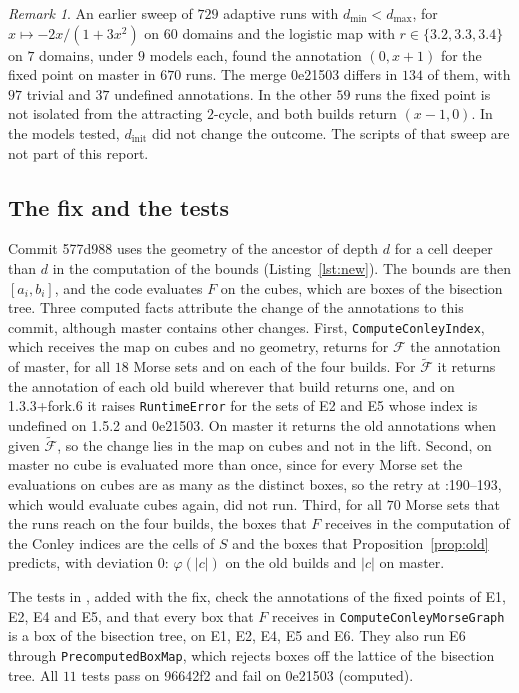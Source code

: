 \documentclass[11pt]{article}
\theoremstyle{plain}
\theoremstyle{definition}
\theoremstyle{remark}
\newtheorem{remark}[proposition]{Remark}
\newcommand{\Fc}{\mathcal{F}}
\newcommand{\Ft}{\tilde{\mathcal{F}}}
\newcommand{\dmin}{d_{\min}}
\newcommand{\dmax}{d_{\max}}
\newcommand{\dinit}{d_{\mathrm{init}}}
\newcommand{\code}[1]{\texttt{#1}}
\begin{document}
\begin{remark}\label{rem:sweep}
An earlier sweep of $729$ adaptive runs with $\dmin<\dmax$, for $x\mapsto-2x/(1+3x^2)$ on $60$ domains and the logistic map with $r\in\{3.2,3.3,3.4\}$ on $7$ domains, under $9$ models each, found the annotation $(0,x+1)$ for the fixed point on master in $670$ runs. The merge 0e21503 differs in $134$ of them, with $97$ trivial and $37$ undefined annotations. In the other $59$ runs the fixed point is not isolated from the attracting $2$-cycle, and both builds return $(x-1,0)$. In the models tested, $\dinit$ did not change the outcome. The scripts of that sweep are not part of this report.
\end{remark}

\subsection{The fix and the tests}\label{sec:fix}

Commit 577d988 uses the geometry of the ancestor of depth $d$ for a cell deeper than $d$ in the computation of the bounds (Listing~\ref{lst:new}). The bounds are then $[a_i,b_i]$, and the code evaluates $F$ on the cubes, which are boxes of the bisection tree. Three computed facts attribute the change of the annotations to this commit, although master contains other changes. First, \code{ComputeConleyIndex}, which receives the map on cubes and no geometry, returns for $\Fc$ the annotation of master, for all $18$ Morse sets and on each of the four builds. For $\Ft$ it returns the annotation of each old build wherever that build returns one, and on 1.3.3+fork.6 it raises \code{RuntimeError} for the sets of E2 and E5 whose index is undefined on 1.5.2 and 0e21503. On master it returns the old annotations when given $\Ft$, so the change lies in the map on cubes and not in the lift. Second, on master no cube is evaluated more than once, since for every Morse set the evaluations on cubes are as many as the distinct boxes, so the retry at :190--193, which would evaluate cubes again, did not run. Third, for all $70$ Morse sets that the runs reach on the four builds, the boxes that $F$ receives in the computation of the Conley indices are the cells of $S$ and the boxes that Proposition~\ref{prop:old} predicts, with deviation $0$: $\varphi(|c|)$ on the old builds and $|c|$ on master.

The tests in , added with the fix, check the annotations of the fixed points of E1, E2, E4 and E5, and that every box that $F$ receives in \code{ComputeConleyMorseGraph} is a box of the bisection tree, on E1, E2, E4, E5 and E6. They also run E6 through \code{PrecomputedBoxMap}, which rejects boxes off the lattice of the bisection tree. All $11$ tests pass on 96642f2 and fail on 0e21503 (computed).
\end{document}
